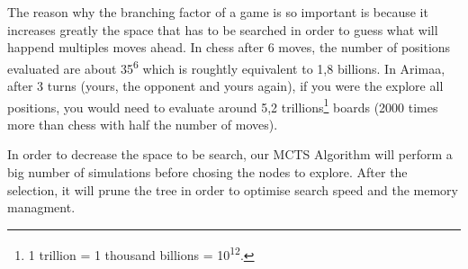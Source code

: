 The reason why the branching factor of a game is so important is because it increases greatly the space that has to be searched in order to guess what will happend multiples moves ahead. In chess after 6 moves, the number of positions evaluated are about 35\textsuperscript{6} which is roughtly equivalent to 1,8 billions. In Arimaa, after 3 turns (yours, the opponent and yours again), if you were the explore all positions, you would need to evaluate around 5,2 trillions\footnote{1 trillion = 1 thousand billions = 10\textsuperscript{12}.} boards (2000 times more than chess with half the number of moves).

In order to decrease the space to be search, our MCTS Algorithm will perform a big number of simulations before chosing the nodes to explore. After the selection, it will prune the tree in order to optimise search speed and the memory managment.
